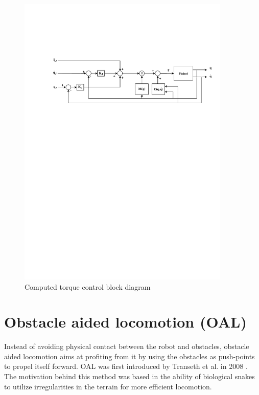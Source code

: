 \begin{figure}
    \centering
    \includegraphics[trim=3cm 19cm 0.5cm 5cm, clip=true, width=0.9\textwidth]{figures/blockdiag.pdf}
    \caption{Computed torque control block diagram}
    \label{fig:block-diag-torque}
\end{figure}





\section{Obstacle aided locomotion (OAL)}

Instead of avoiding physical contact between the robot and obstacles, obstacle aided locomotion aims at profiting from it by using the obstacles as push-points to propel itself forward. OAL was first introduced by Transeth et al. in 2008 \cite{transeth2008snake}. The motivation behind this method was based in the ability of biological snakes to utilize irregularities in the terrain for more efficient locomotion.

